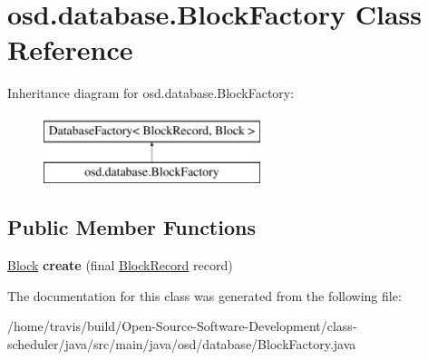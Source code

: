 \hypertarget{classosd_1_1database_1_1_block_factory}{\section{osd.\-database.\-Block\-Factory Class Reference}
\label{classosd_1_1database_1_1_block_factory}
}
Inheritance diagram for osd.\-database.\-Block\-Factory\-:\begin{figure}[H]
\begin{center}
\leavevmode
\includegraphics[height=2.000000cm]{classosd_1_1database_1_1_block_factory}
\end{center}
\end{figure}
\subsection*{Public Member Functions}
\begin{DoxyCompactItemize}
\item 
\hypertarget{classosd_1_1database_1_1_block_factory_a47b00ba770d83db998885fa87035f643}{\hyperlink{interfaceosd_1_1input_1_1_block}{Block} {\bfseries create} (final \hyperlink{classosd_1_1database_1_1_block_record}{Block\-Record} record)}\label{classosd_1_1database_1_1_block_factory_a47b00ba770d83db998885fa87035f643}

\end{DoxyCompactItemize}


The documentation for this class was generated from the following file\-:\begin{DoxyCompactItemize}
\item 
/home/travis/build/\-Open-\/\-Source-\/\-Software-\/\-Development/class-\/scheduler/java/src/main/java/osd/database/Block\-Factory.\-java\end{DoxyCompactItemize}
